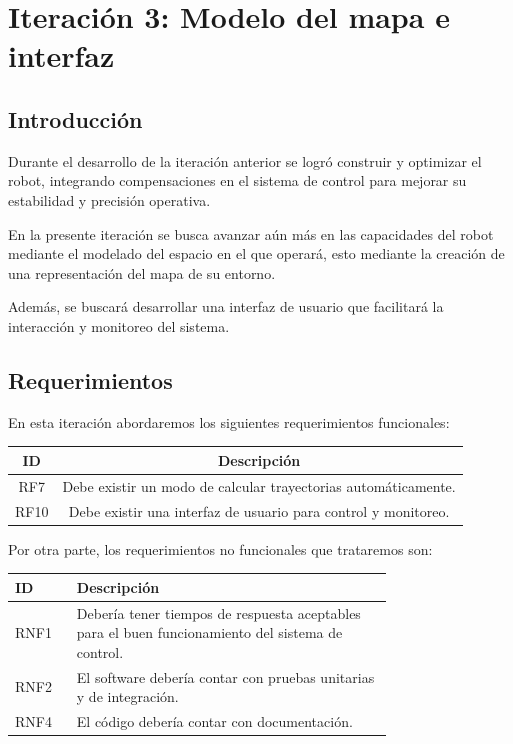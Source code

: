 \newpage
\section{Iteración 3: Modelo del mapa e interfaz}

\subsection{Introducción}
Durante el desarrollo de la iteración anterior se logró construir y optimizar el robot, integrando compensaciones en el sistema de control para mejorar su estabilidad y precisión operativa.

En la presente iteración se busca avanzar aún más en las capacidades del robot mediante el modelado del espacio en el que operará, esto mediante la creación de una representación del mapa de su entorno.

Además, se buscará desarrollar una interfaz de usuario que facilitará la interacción y monitoreo del sistema.

\subsection{Requerimientos}
En esta iteración abordaremos los siguientes requerimientos funcionales:

\begin{center} \begin{tabular}{|c|c|}
\hline
    ID & Descripción \\
\hline
    RF7 & Debe existir un modo de calcular trayectorias automáticamente. \\
\hline
    RF10 & Debe existir una interfaz de usuario para control y monitoreo. \\
\hline
\end{tabular} \end{center}

Por otra parte, los requerimientos no funcionales que trataremos son:

\begin{center} \begin{tabular}{|p{0.10\linewidth}|p{0.65\linewidth}|}
\hline
    ID & Descripción \\
\hline
    RNF1 & Debería tener tiempos de respuesta aceptables para el buen funcionamiento del sistema de control. \\
\hline
    RNF2 & El software debería contar con pruebas unitarias y de integración. \\
\hline
    RNF4 & El código debería contar con documentación.\\
\hline
\end{tabular} \end{center}

